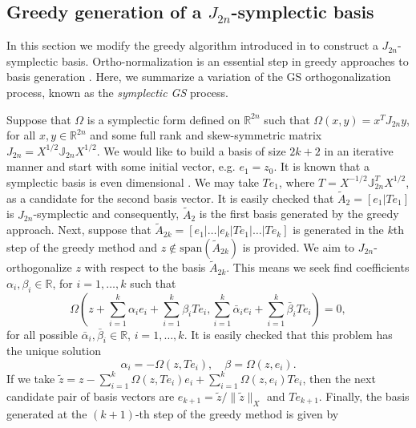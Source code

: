 \subsection{Greedy generation of a $J_{2n}$-symplectic basis} \label{sec:normmor.2}
In this section we modify the greedy algorithm introduced in  to construct a $J_{2n}$-symplectic basis. Ortho-normalization is an essential step in greedy approaches to basis generation \cite{hesthaven2015certified,quarteroni2015reduced}. Here, we summarize a variation of the GS orthogonalization process, known as the \emph{symplectic GS} process.

Suppose that $\Omega$ is a symplectic form defined on $\mathbb R^{2n}$ such that $\Omega(x,y) = x^T J_{2n} y$, for all $x,y\in \mathbb R^{2n}$ and some full rank and skew-symmetric matrix $J_{2n} = X^{1/2} \mathbb J_{2n} X^{1/2}$. We would like to build a basis of size $2k+2$ in an iterative manner and start with some initial vector, e.g. $e_1 = z_0$. It is known that a symplectic basis is even dimensional \cite{Marsden:2010:IMS:1965128}. We may take $Te_1$, where $T = X^{-1/2} \mathbb J_{2n}^{T}X^{1/2}$, as a candidate for the second basis vector. It is easily checked that $\tilde A_2=[e_1|Te_1]$ is $J_{2n}$-symplectic and consequently, $\tilde A_2$ is the first basis generated by the greedy approach. Next, suppose that $\tilde A_{2k} = [e_1|\dots|e_k|Te_1|\dots|Te_k]$ is generated in the $k$th step of the greedy method and $z\not \in \text{span}\left(\tilde A_{2k}\right)$ is provided. We aim to $J_{2n}$-orthogonalize $z$ with respect to the basis $\tilde A_{2k}$. This means we seek find coefficients $\alpha_i,\beta_i\in \mathbb R$, for $i=1,\dots,k$ such that
\begin{equation} \label{eq:normmor.9}
	\Omega\left( z +\sum_{i=1}^{k} \alpha_i e_i +\sum_{i=1}^{k} \beta_i Te_i, \sum_{i=1}^{k}\bar \alpha_i e_i +\sum_{i=1}^{k} \bar \beta_i Te_i \right) = 0,
\end{equation}
for all possible $\bar \alpha_i,\bar \beta_i \in \mathbb R$, $i=1,\dots,k$. It is easily checked that this problem has the unique solution
\begin{equation} \label{eq:normmor.10}
	\alpha_i = - \Omega(z,Te_i), \quad \beta = \Omega(z,e_i).
\end{equation}
If we take $\tilde z = z -\sum_{i=1}^{k} \Omega(z,Te_i) e_i +\sum_{i=1}^{k} \Omega(z,e_i) Te_i$, then the next candidate pair of basis vectors are $e_{k+1} = \tilde z / \| \tilde z \|_X$ and $Te_{k+1}$. Finally, the basis generated at the $(k+1)$-th step of the greedy method is given by
